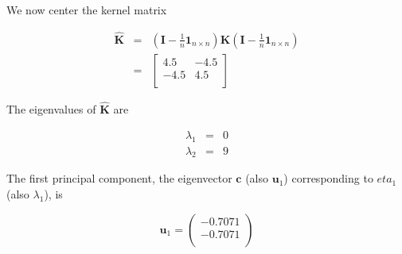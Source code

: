 \documentclass[11pt]{article}
\begin{document}
\begin{enumerate}
We now center the kernel matrix

\begin{eqnarray*}
\hat{\mathbf{K}} &=& \left( \mathbf{I} - \frac{1}{n} \mathbf{1}_{n \times n} \right) \mathbf{K} \left( \mathbf{I} - \frac{1}{n} \mathbf{1}_{n \times n} \right) \nonumber \\
&=& \left[
	\begin{array}{rr}
		4.5 & -4.5 \\
		-4.5 & 4.5 \\	
	\end{array}
\right]
\end{eqnarray*}

The eigenvalues of $\hat{\mathbf{K}}$ are

\begin{eqnarray}
\lambda_1 &=& 0 \\
\lambda_2 &=& 9
\end{eqnarray}

The first principal component, the eigenvector $\mathbf{c}$ (also $\mathbf{u}_1$) corresponding to $eta_1$ (also $\lambda_1$), is

\begin{equation}
\mathbf{u}_1 = \left(
	\begin{array}{r}
		-0.7071 \\
		-0.7071 \\
	\end{array}
\right)
\end{equation}


\end{enumerate}
\end{document}
